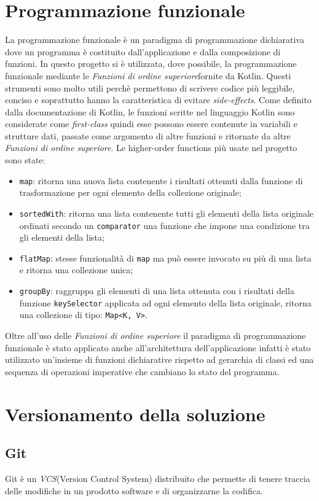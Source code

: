 \section{Programmazione funzionale}
La programmazione funzionale è un paradigma di programmazione dichiarativa dove un programma è costituito dall'applicazione e dalla composizione di funzioni. In questo progetto si è utilizzata, dove possibile, la programmazione funzionale mediante le \emph{Funzioni di ordine superiore}\glosp fornite da Kotlin. Questi strumenti sono molto utili perchè permettono di scrivere codice più leggibile, conciso e soprattutto hanno la caratteristica di evitare \emph{side-effects}\glo. Come definito dalla documentazione di Kotlin, le funzioni scritte nel linguaggio Kotlin sono considerate come \emph{first-class} quindi esse possono essere contenute in variabili e strutture dati, passate come argomento di altre funzioni e ritornate da altre \emph{Funzioni di ordine superiore}. Le higher-order functions più usate nel progetto sono state:
\begin{itemize}
	\item \verb|map|: ritorna una nuova lista contenente i risultati ottenuti dalla funzione di trasformazione per ogni elemento della collezione originale;
	\item \verb|sortedWith|: ritorna una lista contenente tutti gli elementi della lista originale ordinati secondo un \verb|comparator| una funzione che impone una condizione tra gli elementi della lista;
	\item \verb|flatMap|: stesse funzionalità di \verb|map| ma può essere invocato su più di una lista e ritorna una collezione unica;
	\item \verb|groupBy|: raggruppa gli elementi di una lista ottenuta con i risultati della funzione \verb|keySelector| applicata ad ogni elemento della lista originale, ritorna una collezione di tipo: \verb|Map<K, V>|.
\end{itemize}
Oltre all'uso delle \emph{Funzioni di ordine superiore} il paradigma di programmazione funzionale è stato applicato anche all'architettura dell'applicazione infatti è stato utilizzato un'insieme di funzioni dichiarative rispetto ad gerarchia di classi ed una sequenza di operazioni imperative che cambiano lo stato del programma.

\section{Versionamento della soluzione}
\subsection{Git}
Git è un \emph{VCS}\glosp (Version Control System) distribuito che permette di tenere traccia delle modifiche in un prodotto software e di organizzarne la codifica. 

